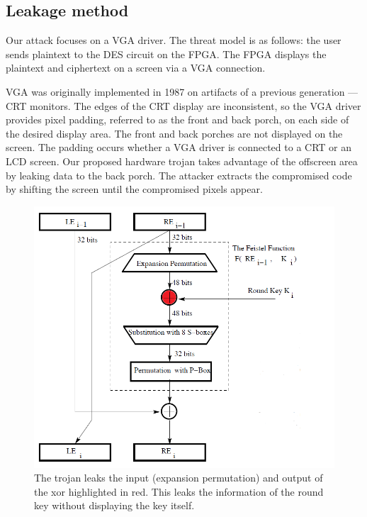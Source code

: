 	\subsection{Leakage method}\label{s:leak}
	Our attack focuses on a VGA driver. The threat model is as follows: the user sends plaintext to the DES circuit on the FPGA. The FPGA displays the plaintext and ciphertext on a screen via a VGA connection. 

	VGA was originally implemented in 1987 on artifacts of a previous generation --- CRT monitors. The edges of the CRT display are inconsistent, so the VGA driver provides pixel padding, referred to as the front and back porch, on each side of the desired display area. The front and back porches are not displayed on the screen. The padding occurs whether a VGA driver is connected to a CRT or an LCD screen. Our proposed hardware trojan takes advantage of the offscreen area by leaking data to the back porch. The attacker extracts the compromised code by shifting the screen until the compromised pixels appear. 


		\begin{figure}[htbp]
		\centering
		\includegraphics[scale=.4]{des}
		\caption{The trojan leaks the input (expansion permutation) and output of the xor highlighted in red. This leaks the information of the round key without displaying the key itself. }\label{fig:des}
		\end{figure}

